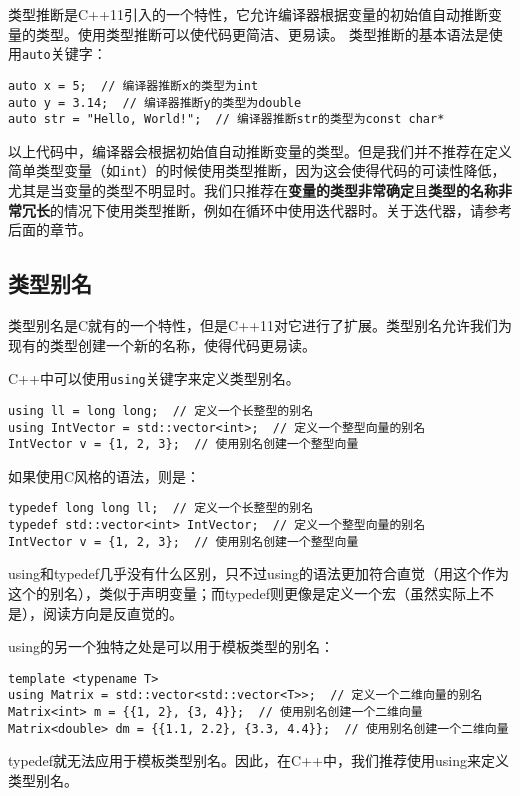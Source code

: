 \documentclass[../main.tex]{subfiles}
\begin{document}
类型推断是C++11引入的一个特性，它允许编译器根据变量的初始值自动推断变量的类型。使用类型推断可以使代码更简洁、更易读。
类型推断的基本语法是使用\texttt{auto}关键字：
\begin{lstlisting}
auto x = 5;  // 编译器推断x的类型为int
auto y = 3.14;  // 编译器推断y的类型为double
auto str = "Hello, World!";  // 编译器推断str的类型为const char*
\end{lstlisting}
以上代码中，编译器会根据初始值自动推断变量的类型。但是我们并不推荐在定义简单类型变量（如\texttt{int}）的时候使用类型推断，因为这会使得代码的可读性降低，尤其是当变量的类型不明显时。我们只推荐在\textbf{变量的类型非常确定}且\textbf{类型的名称非常冗长}的情况下使用类型推断，例如在循环中使用迭代器时。关于迭代器，请参考后面的章节。

\subsection{类型别名}

类型别名是C就有的一个特性，但是C++11对它进行了扩展。类型别名允许我们为现有的类型创建一个新的名称，使得代码更易读。

C++中可以使用\texttt{using}关键字来定义类型别名。
\begin{lstlisting}
using ll = long long;  // 定义一个长整型的别名
using IntVector = std::vector<int>;  // 定义一个整型向量的别名
IntVector v = {1, 2, 3};  // 使用别名创建一个整型向量
\end{lstlisting}

如果使用C风格的语法，则是：
\begin{lstlisting}
typedef long long ll;  // 定义一个长整型的别名
typedef std::vector<int> IntVector;  // 定义一个整型向量的别名
IntVector v = {1, 2, 3};  // 使用别名创建一个整型向量
\end{lstlisting}

using和typedef几乎没有什么区别，只不过using的语法更加符合直觉（用这个作为这个的别名），类似于声明变量；而typedef则更像是定义一个宏（虽然实际上不是），阅读方向是反直觉的。

using的另一个独特之处是可以用于模板类型的别名：
\begin{lstlisting}
template <typename T>
using Matrix = std::vector<std::vector<T>>;  // 定义一个二维向量的别名
Matrix<int> m = {{1, 2}, {3, 4}};  // 使用别名创建一个二维向量
Matrix<double> dm = {{1.1, 2.2}, {3.3, 4.4}};  // 使用别名创建一个二维向量
\end{lstlisting}
typedef就无法应用于模板类型别名。因此，在C++中，我们推荐使用using来定义类型别名。
\end{document}
